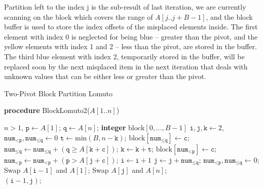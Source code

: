 \documentclass{article}
\newcommand\lomutotwo{\textsf{BlockLomuto2}}
\begin{document}
Partition left to the index j is the sub-result of last iteration, we are currently scanning on the block which covers the range of $A[j..j+B-1]$, and the block buffer is used to store the index offsets of the misplaced elements inside.
The first element with index 0 is neglected for being blue -- greater than the pivot, and the yellow elements with index 1 and 2 -- less than the pivot, are stored in the buffer. The third blue element with index 2, temporarily stored in the buffer, will be replaced soon by the next misplaced item in the next iteration that deals with unknown values that can be either less or greater than the pivot.

\begin{algorithm}[t!]
    \small
    \caption{Two-Pivot Block Partition Lomuto}\samepage\label{algo:dual:pivot:partitioning}
    \textbf{procedure} \lomutotwo($\textit{A}[1..\textit{n}]$)
    \begin{algorithmic}[1]
        \Require $n > 1$, 
        \State $\texttt{p} \gets \textit{A}[1]$; $\texttt{q} \gets \textit{A}[n]$; 
    \State \textbf{integer} $\text{block}[0, \ldots, \textit{B} - 1]$
    \State  $\texttt{i}, \texttt{j}, \texttt{k} \gets 2$, $\texttt{num}_{< \texttt{p}}, \texttt{num}_{\leq \texttt{q}} \gets 0$
    \State $\texttt{t} \gets \text{min}(\textit{B}, \textit{n} - \texttt{k} )$;
            \State $\text{block}[\texttt{num}_{\leq \texttt{q}}] \gets \texttt{c}$;
        \State $\texttt{num}_{\leq \texttt{q}} \gets \texttt{num}_{\leq \texttt{q}} +  (\texttt{q} \geq \textit{A}[\texttt{k} + \texttt{c}])$;
            \EndFor
        \State {}
            \EndFor
            \State $\texttt{k} \gets \texttt{k} + \texttt{t}$;
        \State $\text{block}[\texttt{num}_{< \texttt{p}}] \gets \texttt{c}$;
    \State $\texttt{num}_{< \texttt{p}} \gets \texttt{num}_{< \texttt{p}} +  (\texttt{p} > \textit{A}[\texttt{j} + \texttt{c}])$;
            \EndFor
        \State {}
        \State $\texttt{i} \gets \texttt{i} + 1$
            \EndFor
            \State $\texttt{j} \gets \texttt{j} + \texttt{num}_{\leq \texttt{q}}$;
    \State $\texttt{num}_{< \texttt{p}}, \texttt{num}_{\leq \texttt{q}} \gets 0$;
        \EndWhile
        \State Swap $\textit{A}[\texttt{i} - 1]$ and $\textit{A}[1]$;
    \State Swap $\textit{A}[\texttt{j}]$ and $\textit{A}[\textit{n}]$;\\
\Return $(\texttt{i} - 1,\texttt{j})$;
    \end{algorithmic}
\end{algorithm}
\end{document}

